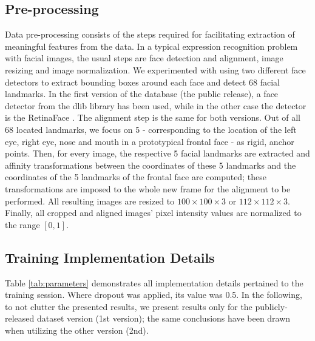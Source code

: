 \documentclass[10pt,twocolumn,letterpaper]{article}
\begin{document}
\subsection{Pre-processing}

Data pre-processing consists of the steps required for facilitating extraction of meaningful features from the data. In a typical expression recognition problem with facial images, the usual steps are face detection and alignment, image resizing and image normalization. We experimented with using two different face detectors to extract bounding boxes around each face and detect 68 facial landmarks. In the first version of the database (the public release), a face detector from the dlib library has been used, while in the other case the detector is the RetinaFace \cite{deng2020retinaface}. The alignment step is the same for both versions. Out of all 68 located landmarks, we focus on 5 - corresponding to the location of the left eye, right eye, nose and mouth in a prototypical frontal face - as rigid, anchor points. Then, for every image, the respective 5 facial landmarks are extracted and affinity transformations between the coordinates of these 5 landmarks and the coordinates of the 5 landmarks of the frontal face are computed; these transformations are imposed to the whole new frame for the alignment to be performed. All resulting images are resized to $100 \times 100 \times 3$ or $112 \times 112 \times 3$. Finally, all cropped and aligned images' pixel intensity values are normalized to the range $[0,1]$.   



\subsection{Training Implementation Details}
 
  
 
 
Table \ref{tab:parameters} demonstrates all implementation details pertained to the training session. Where dropout \cite{srivastava2014dropout} was applied, its value was 0.5. In the following, to not clutter the presented results, we present results only for the publicly-released dataset version (1st version); the same conclusions have been drawn when utilizing the other version (2nd). 
 
\end{document}
